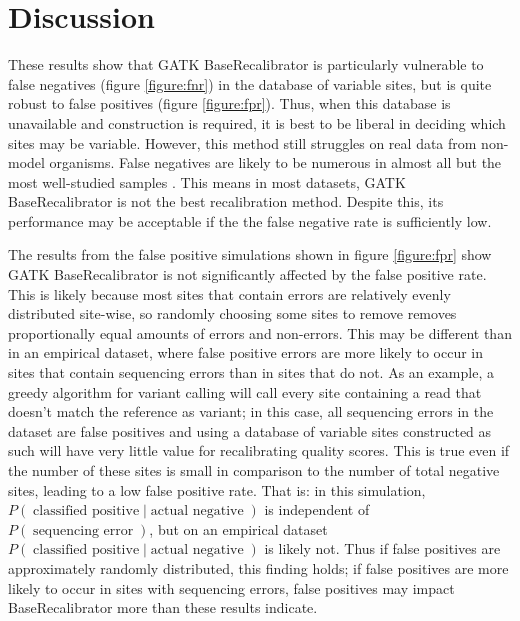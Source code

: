 \documentclass{article}
\begin{document}
\section{Discussion}
\begin{outline}
	\item These results show that GATK BaseRecalibrator is particularly vulnerable to false negatives (figure \ref{figure:fnr}) in the database of variable sites, but is quite robust to false positives (figure \ref{figure:fpr}). Thus, when this database is unavailable and construction is required, it is best to be liberal in deciding which sites may be variable. However, this method still struggles on real data from non-model organisms. False negatives are likely to be numerous in almost all but the most well-studied samples \parencite{bobo_false_2016}. This means in most datasets, GATK BaseRecalibrator is not the best recalibration method. Despite this, its performance may be acceptable if the the false negative rate is sufficiently low.
	
	\item The results from the false positive simulations shown in figure \ref{figure:fpr} show GATK BaseRecalibrator is not significantly affected by the false positive rate. This is likely because most sites that contain errors are relatively evenly distributed site-wise, so randomly choosing some sites to remove removes proportionally equal amounts of errors and non-errors. This may be different than in an empirical dataset, where false positive errors are more likely to occur in sites that contain sequencing errors than in sites that do not. As an example, a greedy algorithm for variant calling will call every site containing a read that doesn't match the reference as variant; in this case, all sequencing errors in the dataset are false positives and using a database of variable sites constructed as such will have very little value for recalibrating quality scores. This is true even if the number of these sites is small in comparison to the number of total negative sites, leading to a low false positive rate. That is: in this simulation, $P(\operatorname{classified\:positive} | \operatorname{actual\:negative})$ is independent of $P(\operatorname{sequencing\:error})$, but on an empirical dataset $P(\operatorname{classified\:positive} | \operatorname{actual\:negative})$ is likely not. Thus if false positives are approximately randomly distributed, this finding holds; if false positives are more likely to occur in sites with sequencing errors, false positives may impact BaseRecalibrator more than these results indicate. %


\end{outline}
\end{document}
